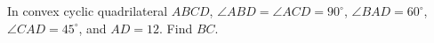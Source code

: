 In convex cyclic quadrilateral $ABCD$, $\angle ABD=\angle ACD=90^\circ$, $\angle BAD=60^\circ$, $\angle CAD=45^\circ$, and $AD=12$. Find $BC$.
